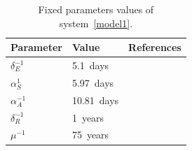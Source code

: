 \begin{table}[h!]
    \begin{center}
        \begin{tabular}{>{\centering}p{}p{}p{}}
            \toprule
            Parameter & Value & References
            \\
            \midrule
            $\delta_{E}^{-1}$ & \SI{5.1}{days}   &  \cite{Tian2020}
            \\
            $\alpha_{S}^{1}$  & \SI{5.97}{days}  &  \cite{Acuna2020}
            \\
            $\alpha_{A}^{-1}$ & \SI{10.81}{days} & \cite{Acuna2020}
            \\
            $\delta_{R}^{-1}$ & \SI{1}{years}     &
            \\
            $\mu^{-1}$        & \SI{75}{years}   &
            \\
            \bottomrule
        \end{tabular}
        \caption{
            Fixed parameters values of system~\ref{model1}.
        }
        \label{table_fixparam}
    \end{center}
\end{table}
%

